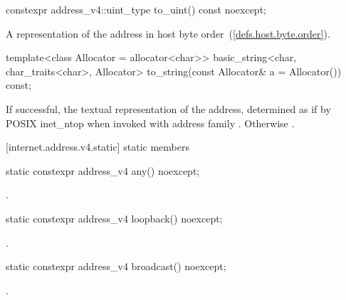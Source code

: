 %
\begin{itemdecl}
constexpr address_v4::uint_type to_uint() const noexcept;
\end{itemdecl}

\begin{itemdescr}
\pnum
\returns A representation of the address in host byte order~(\ref{defs.host.byte.order}).
\end{itemdescr}

%
\begin{itemdecl}
template<class Allocator = allocator<char>>
  basic_string<char, char_traits<char>, Allocator>
    to_string(const Allocator& a = Allocator()) const;
\end{itemdecl}

\begin{itemdescr}
\pnum
\returns If successful, the textual representation of the address, determined as if by POSIX inet_ntop when invoked with address family . Otherwise .
\end{itemdescr}



[internet.address.v4.static]{ static members}

%
\begin{itemdecl}
static constexpr address_v4 any() noexcept;
\end{itemdecl}

\begin{itemdescr}
\pnum
\returns {}.
\end{itemdescr}

%
\begin{itemdecl}
static constexpr address_v4 loopback() noexcept;
\end{itemdecl}

\begin{itemdescr}
\pnum
\returns {}.
\end{itemdescr}

%
\begin{itemdecl}
static constexpr address_v4 broadcast() noexcept;
\end{itemdecl}

\begin{itemdescr}
\pnum
\returns {}.
\end{itemdescr}



